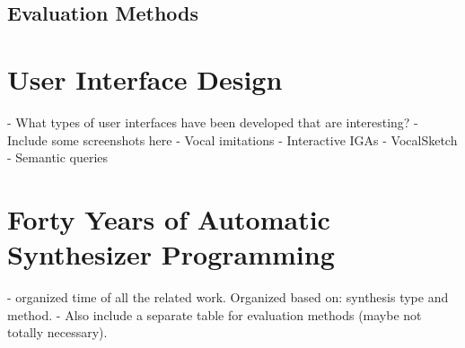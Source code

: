 \subsection{Evaluation Methods}
 
\section{User Interface Design}
- What types of user interfaces have been developed that are interesting?
- Include some screenshots here
- Vocal imitations
- Interactive IGAs
- VocalSketch
- Semantic queries
 
\section{Forty Years of Automatic Synthesizer Programming}
- organized time of all the related work. Organized based on: synthesis type and method.
- Also include a separate table for evaluation methods (maybe not totally necessary).

